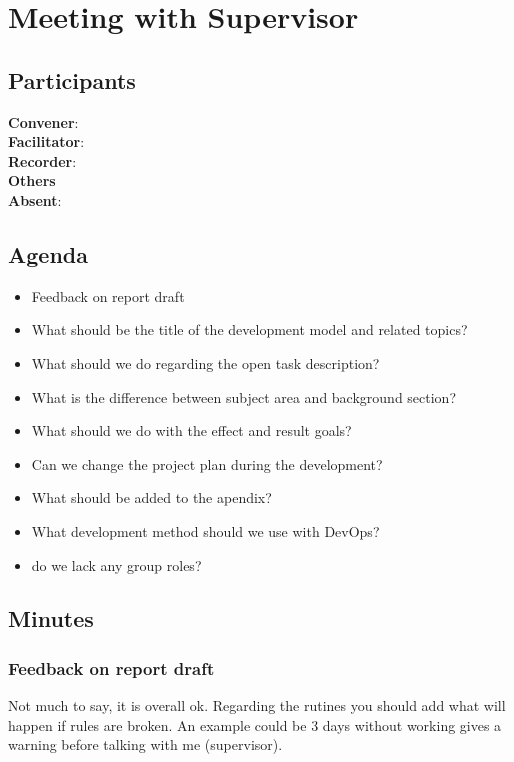 \section*{Meeting with Supervisor}

\subsection*{Participants}

\textbf{Convener}: \supervisor{} \\
\textbf{Facilitator}: \facilitator{}  \\
\textbf{Recorder}: \scrummaster{}  \\
\textbf{Others}                            \\
\textbf{Absent}: \groupleader{}

\subsection*{Agenda}
\begin{itemize}
    \item Feedback on report draft
    \item What should be the title of the development model and related topics?
    \item What should we do regarding the open task description? 
    \item What is the difference between subject area and background section?
    \item What should we do with the effect and result goals?
    \item Can we change the project plan during the development?
    \item What should be added to the apendix?
    \item What development method should we use with DevOps?
    \item do we lack any group roles?
\end{itemize}

\subsection*{Minutes}

\subsubsection*{Feedback on report draft}

Not much to say, it is overall ok. Regarding the rutines you should add what will happen if rules are broken.
An example could be 3 days without working gives a warning before talking with me (supervisor). 

